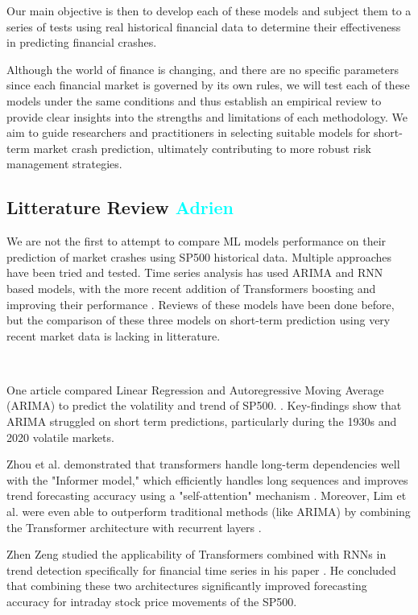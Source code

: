 \documentclass[12pt, letterpaper]{article}
\begin{document}
Our main objective is then to develop each of these models and subject them to a series of tests using real historical financial data to determine their effectiveness in predicting financial crashes. 

Although the world of finance is changing, and there are no specific parameters since each financial market is governed by its own rules, we will test each of these models under the same conditions and thus establish an empirical review to provide clear insights into the strengths and limitations of each methodology. We aim to guide researchers and practitioners in selecting suitable models for short-term market crash prediction, ultimately contributing to more robust risk management strategies.



\subsection*{Litterature Review \textcolor{cyan}{Adrien}}
    We are not the first to attempt to compare ML models performance on their prediction of market crashes using SP500 historical data. 
    Multiple approaches have been tried and tested. Time series analysis has used ARIMA and RNN based models, with the more recent addition of Transformers boosting and improving their performance  \cite{Okpeke, Ahmed, ArunKumar}. 
    Reviews of these models have been done before, but the comparison of these three models on short-term prediction using very recent market data is lacking in litterature. 
    
    \ 

    One article compared Linear Regression and Autoregressive Moving Average (ARIMA) to predict the volatility and trend of SP500. \cite{sp500arimalstmregression}. 
    Key-findings show that ARIMA struggled on short term predictions, particularly during the 1930s and 2020 volatile markets. 
    
    Zhou et al. demonstrated that transformers handle long-term dependencies well with the "Informer model," which efficiently handles long sequences and improves trend forecasting accuracy using a "self-attention" mechanism \cite{zhou2021informer}. Moreover, Lim et al. were even able to outperform traditional methods (like ARIMA) by combining the Transformer architecture with recurrent layers \cite{lim2021temporal}. 
    
    Zhen Zeng studied the applicability of Transformers combined with RNNs in trend detection specifically for financial time series in his paper \cite{zeng2023financial}. He concluded that combining these two architectures significantly improved forecasting accuracy for intraday stock price movements of the SP500.
    
\end{document}
